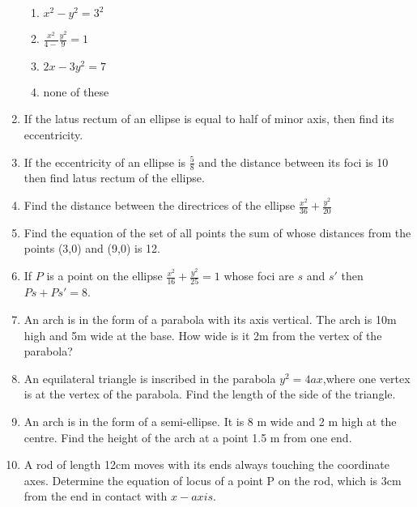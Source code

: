 \begin{enumerate}[label=\thesubsection.\arabic*,ref=\thesubsection.\theenumi]
\begin{enumerate}
\item $x^2-y^2=3^2$
\item $\frac{x^2}{4-}\frac{y^2}{9}=1$
\item $2x-3y^2=7$
 \item none of these
 \end{enumerate}
 \item If the latus rectum of an ellipse is equal to half of minor axis, then find its eccentricity.
 \item If the eccentricity of an ellipse is $\frac{5}{8}$ and  the distance between its foci is 10 then find latus rectum of the ellipse.
 \item Find the distance between the directrices of the ellipse $\frac{x^2}{36}+\frac{y^2}{20}$
\item Find the equation of the set of all points the sum of whose distances  from the points (3,0) and (9,0) is 12.
\item If ${P}$ is a point on the ellipse $\frac{x^2}{16}+\frac{y^2}{25}=1$ whose foci  are $s$ and $s'$ then $Ps +Ps'=8$.
\item An arch is in the form of a parabola with its axis vertical. The arch is 10m high and 5m wide at the base. How wide is it 2m from the vertex of the parabola?
\label{chapters/11/11/5/2}
\item An equilateral triangle is inscribed in the parabola $y^{2} = 4ax$,where one vertex is at the vertex of the parabola. Find the length of the side of the triangle.
\label{chapters/11/11/5/8}
\item An arch is in the form of a semi-ellipse. It is 8 m wide and 2 m high at the centre. Find the height of the arch at a point 1.5 m from one end.
\label{chapters/11/11/5/4}
\item A rod of length 12cm moves with its ends always touching the coordinate axes. Determine the equation of locus of a point  P on the rod, which is 3cm from the end in contact with $x-axis$.
\label{chapters/11/11/5/5}
\end{enumerate}
